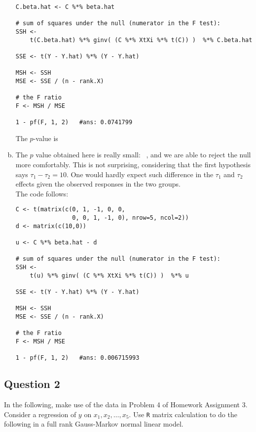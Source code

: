 \documentclass[paper=a4, fontsize=11pt]{scrartcl} %
\begin{document}
\begin{enumerate}[(a)]
\begin{lstlisting}[basicstyle=\ttfamily\small\bfseries]
C.beta.hat <- C %*% beta.hat 

# sum of squares under the null (numerator in the F test):
SSH <- 
    t(C.beta.hat) %*% ginv( (C %*% XtXi %*% t(C)) )  %*% C.beta.hat 

SSE <- t(Y - Y.hat) %*% (Y - Y.hat) 

MSH <- SSH
MSE <- SSE / (n - rank.X) 

# the F ratio
F <- MSH / MSE

1 - pf(F, 1, 2)   #ans: 0.0741799
\end{lstlisting}

The $p$-value is \ \\


\item   The $p$ value obtained here is really small: \ , and we are able to reject the null more comfortably. This is not surprising, considering 
that the first hypothesis says $\tau_1 - \tau_2 = 10$. One would hardly expect such difference in the 
$\tau_1$ and $\tau_2$ effects given the observed responses in the two groups.\\

The code follows:\\
 
 \begin{lstlisting}[basicstyle=\ttfamily\small\bfseries]
C <- t(matrix(c(0, 1, -1, 0, 0,
                0, 0, 1, -1, 0), nrow=5, ncol=2))
d <- matrix(c(10,0))

u <- C %*% beta.hat - d

# sum of squares under the null (numerator in the F test):
SSH <- 
    t(u) %*% ginv( (C %*% XtXi %*% t(C)) )  %*% u 

SSE <- t(Y - Y.hat) %*% (Y - Y.hat) 

MSH <- SSH
MSE <- SSE / (n - rank.X) 

# the F ratio
F <- MSH / MSE

1 - pf(F, 1, 2)   #ans: 0.006715993
\end{lstlisting}

\end{enumerate}

\bigskip
\bigskip
\subsection*{Question 2}
In the following, make use of the data in Problem 4 of Homework Assignment 3. 
Consider a regression of $y$ on $x_1, x_2, \ldots, x_5$. Use \texttt{R} matrix 
calculation to do the following in a full rank Gauss-Markov normal linear model.\\
\end{document}
